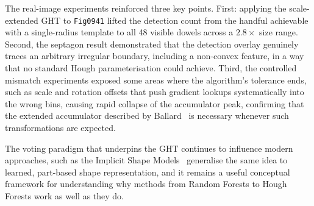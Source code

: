 \documentclass[12pt,a4paper]{article}
\begin{document}
The real-image experiments reinforced three key points.  First: applying the scale-extended
GHT to \texttt{Fig0941} lifted the
detection count from the handful achievable with a single-radius template to all 48
visible dowels across a $2.8\times$ size range.  Second, the septagon result
demonstrated that the detection overlay genuinely traces an arbitrary irregular
boundary, including a non-convex feature, in a way that no standard Hough
parameterisation could achieve.  Third, the controlled mismatch experiments exposed some areas where the algorithm's tolerance ends, such as scale and rotation offsets that push gradient
lookups systematically into the wrong bins, causing rapid collapse of the
accumulator peak, confirming that the extended accumulator described by
Ballard~\cite{ballard1981} is necessary whenever such transformations are expected.

The voting paradigm that underpins the GHT continues to influence modern
approaches, such as the Implicit Shape Models~\cite{leibe2004} generalise the same idea to
learned, part-based shape representation, and it remains a useful conceptual
framework for understanding why methods from Random Forests to Hough Forests work as
well as they do.
\end{document}
